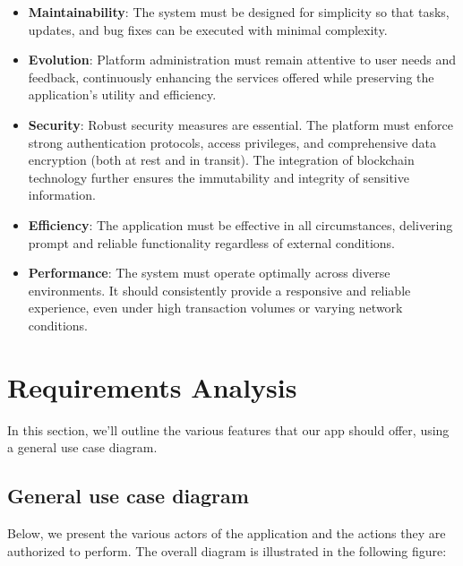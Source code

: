\begin{itemize}
    \item \textbf{Maintainability}: The system must be designed for simplicity so that tasks, updates, and bug fixes can be executed with minimal complexity.
    
    \item \textbf{Evolution}: Platform administration must remain attentive to user needs and feedback, continuously enhancing the services offered while preserving the application's utility and efficiency.
    
    \item \textbf{Security}: Robust security measures are essential. The platform must enforce strong authentication protocols, access privileges, and comprehensive data encryption (both at rest and in transit). The integration of blockchain technology further ensures the immutability and integrity of sensitive information.
    
    \item \textbf{Efficiency}: The application must be effective in all circumstances, delivering prompt and reliable functionality regardless of external conditions.
    
    \item \textbf{Performance}: The system must operate optimally across diverse environments. It should consistently provide a responsive and reliable experience, even under high transaction volumes or varying network conditions.
\end{itemize} 

\section{Requirements Analysis}

In this section, we'll outline the various features that our app should offer, using a general use case diagram.

\subsection{General use case diagram}

Below, we present the various actors of the application and the actions they are authorized to perform.
The overall diagram is illustrated in the following figure:

